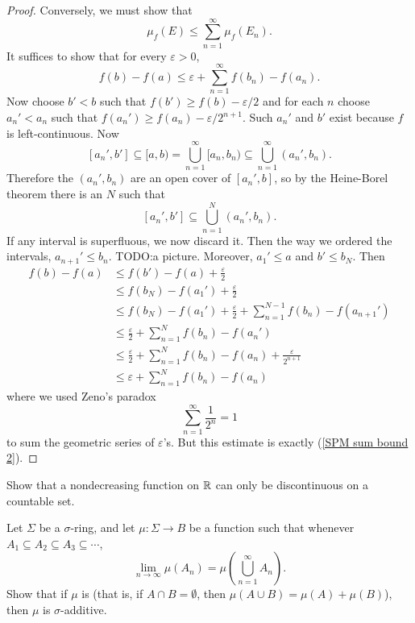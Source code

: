 \begin{proof}
Conversely, we must show that
\[\mu_f(E) \leq \sum_{n=1}^{\infty} \mu_f(E_{n}).\]
It suffices to show that for every $\varepsilon > 0$,
\begin{equation}\label{SPM sum bound 2}
f(b) - f(a) \leq \varepsilon + \sum_{n=1}^{\infty} f(b_{n}) - f(a_{n}).
\end{equation}
Now choose $b' < b$ such that $f(b') \geq f(b) - \varepsilon/2$ and for each $n$ choose $a_{n}' < a_{n}$ such that $f(a_{n}') \geq f(a_{n}) - \varepsilon/2^{n+1}$.
Such $a_{n}'$ and $b'$ exist because $f$ is left-continuous.
Now
\[[a_{n}', b'] \subseteq [a, b) = \bigcup_{n=1}^{\infty} [a_{n}, b_{n}) \subseteq \bigcup_{n=1}^{\infty} (a_{n}', b_{n}).\]
Therefore the $(a_{n}', b_{n})$ are an open cover of $[a_{n}', b]$, so by the Heine-Borel theorem there is an $N$ such that
\[[a_{n}', b'] \subseteq \bigcup_{n=1}^{N} (a_{n}', b_{n}).\]
If any interval is superfluous, we now discard it.
Then the way we ordered the intervals, $a_{n+1}' \leq b_{n}$.
TODO:\@Draw a picture.
Moreover, $a_1' \leq a$ and $b' \leq b_N$. Then
\begin{align*}
f(b) - f(a) &\leq f(b') - f(a) + \frac{\varepsilon}{2}\\
& \leq f(b_N) - f(a_1') + \frac{\varepsilon}{2}\\
& \leq f(b_N) - f(a_1') + \frac{\varepsilon}{2} + \sum_{n=1}^{N-1} f(b_{n}) - f(a_{n+1}')\\
& \leq \frac{\varepsilon}{2} + \sum_{n=1}^{N} f(b_{n}) - f(a_{n}')\\
& \leq \frac{\varepsilon}{2} + \sum_{n=1}^{N} f(b_{n}) - f(a_{n}) + \frac{\varepsilon}{2^{n+1}}\\
& \leq \varepsilon + \sum_{n=1}^{N} f(b_{n}) - f(a_{n})
\end{align*}
where we used Zeno's paradox
\begin{equation}\label{zeno}
\sum_{n=1}^{\infty} \frac{1}{2^n} = 1
\end{equation}
to sum the geometric series of $\varepsilon$'s.
But this estimate is exactly (\ref{SPM sum bound 2}).
\end{proof}

\begin{exercise}\label{nondecreasing exercise}
Show that a nondecreasing function on $\mathbb{R}$ can only be discontinuous on a countable set.
\end{exercise}

\begin{exercise}
Let $\Sigma$ be a $\sigma$-ring, and let $\mu: \Sigma \to B$ be a function such that whenever $A_1 \subseteq A_2 \subseteq A_3 \subseteq \cdots$,
\[\lim_{n \to \infty} \mu(A_{n}) = \mu\left(\bigcup_{n=1}^{\infty} A_{n}\right).\]
Show that if $\mu$ is  (that is, if $A \cap B = \emptyset$, then $\mu(A \cup B) = \mu(A) + \mu(B)$), then $\mu$ is $\sigma$-additive.
\end{exercise}

